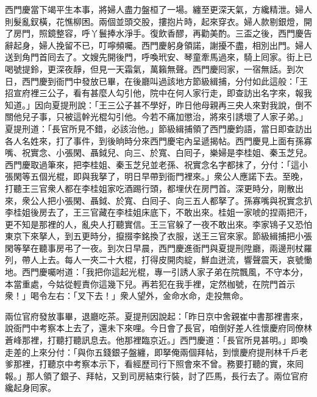 西門慶當下竭平生本事，將婦人盡力盤桓了一場。纏至更深天氣，方纔精泄。婦人則髮亂釵橫，花憔柳困。兩個並頭交股，摟抱片時，起來穿衣。婦人款剔銀燈，開了房門，照鏡整容，呼丫鬟捧水淨手。復飲香醪，再勸美酌。三盃之後，西門慶告辭起身，婦人挽留不已，叮嚀頻囑。西門慶躬身領諾，謝擾不盡，相別出門。婦人送到角門首囘去了。文嫂先開後門，呼喚玳安、琴童牽馬過來，騎上囘家。街上已喝號提鈴，更深夜靜，但見一天霜氣，萬籟無聲。西門慶囘家，一宿無話。到次日，西門慶到衙門中發放已畢，在後廳叫過該地方節級緝捕，分付如此這般：「王招宣府裡三公子，看有甚麼人勾引他，院中在何人家行走，即查訪出名字來，報我知道。」因向夏提刑說：「王三公子甚不學好，昨日他母親再三央人來對我說，倒不關他兒子事，只被這幹光棍勾引他。今若不痛加懲治，將來引誘壞了人家子弟。」夏提刑道：「長官所見不錯，必該治他。」節級緝捕領了西門慶鈞語，當日即查訪出各人名姓來，打了事件，到後晌時分來西門慶宅內呈遞揭帖。西門慶見上面有孫寡嘴、祝實念、小張閑、聶鉞兒、向三、於寬、白囘子，樂婦是李桂姐、秦玉芝兒。西門慶取過筆來，把李桂姐、秦玉芝兒並老孫、祝實念名字都抹了，分付：「這小張閑等五個光棍，即與我拏了，明日早帶到衙門裡來。」衆公人應諾下去。至晚，打聽王三官衆人都在李桂姐家吃酒踢行頭，都埋伏在房門首。深更時分，剛散出來，衆公人把小張閑、聶鉞、於寬、白囘子、向三五人都拏了。孫寡嘴與祝實念扒李桂姐後房去了，王三官藏在李桂姐床底下，不敢出來。桂姐一家唬的捏兩把汗，更不知是那裡的人，亂央人打聽實信。王三官躲了一夜不敢出來。李家鴇子又恐怕東京下來拏人，到五更時分，攛掇李銘換了衣服，送王三官來家。節級緝捕把小張閑等拏在聽事房弔了一夜。到次日早晨，西門慶進衙門與夏提刑陞廳，兩邊刑杖羅列，帶人上去。每人一夾二十大棍，打得皮開肉綻，鮮血迸流，響聲震天，哀號慟地。西門慶囑咐道：「我把你這起光棍，專一引誘人家子弟在院飄風，不守本分，本當重處，今姑從輕責你這幾下兒。再若犯在我手裡，定然枷號，在院門首示衆！」喝令左右：「叉下去！」衆人望外，金命水命，走投無命。

兩位官府發放事畢，退廳吃茶。夏提刑因說起：「昨日京中舍親崔中書那裡書來，說衙門中考察本上去了，還未下來哩。今日會了長官，咱倒好差人徃懷慶府同僚林蒼峰那裡，打聽打聽訊息去。他那裡臨京近。」西門慶道：「長官所見甚明。」即喚走差的上來分付：「與你五錢銀子盤纏，即拏俺兩個拜帖，到懷慶府提刑林千戶老爹那裡，打聽京中考察本示下，看經歷司行下照會來不曾。務要打聽的實，來囘報。」那人領了銀子、拜帖，又到司房結束行裝，討了匹馬，長行去了。兩位官府纔起身囘家。

